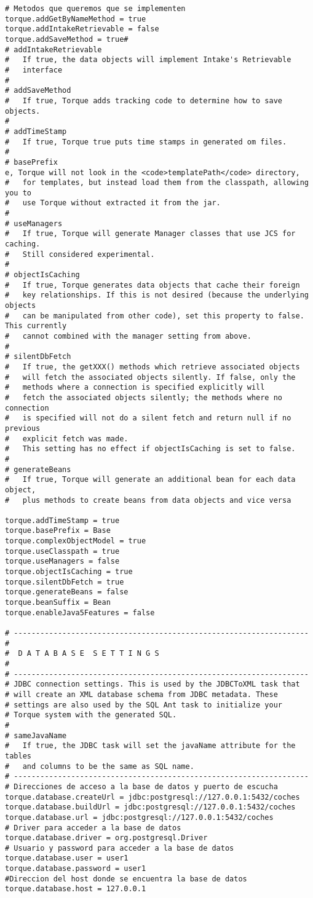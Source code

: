 \begin{lstlisting}
# Metodos que queremos que se implementen
torque.addGetByNameMethod = true
torque.addIntakeRetrievable = false
torque.addSaveMethod = true#
# addIntakeRetrievable
#   If true, the data objects will implement Intake's Retrievable
#   interface
#
# addSaveMethod
#   If true, Torque adds tracking code to determine how to save objects.
#
# addTimeStamp
#   If true, Torque true puts time stamps in generated om files.
#
# basePrefix
e, Torque will not look in the <code>templatePath</code> directory,
#   for templates, but instead load them from the classpath, allowing you to
#   use Torque without extracted it from the jar.
#
# useManagers
#   If true, Torque will generate Manager classes that use JCS for caching.
#   Still considered experimental.
#
# objectIsCaching
#   If true, Torque generates data objects that cache their foreign
#   key relationships. If this is not desired (because the underlying objects
#   can be manipulated from other code), set this property to false. This currently
#   cannot combined with the manager setting from above.
#
# silentDbFetch
#   If true, the getXXX() methods which retrieve associated objects
#   will fetch the associated objects silently. If false, only the
#   methods where a connection is specified explicitly will
#   fetch the associated objects silently; the methods where no connection
#   is specified will not do a silent fetch and return null if no previous
#   explicit fetch was made.
#   This setting has no effect if objectIsCaching is set to false.
#
# generateBeans
#   If true, Torque will generate an additional bean for each data object,
#   plus methods to create beans from data objects and vice versa

torque.addTimeStamp = true
torque.basePrefix = Base
torque.complexObjectModel = true
torque.useClasspath = true
torque.useManagers = false
torque.objectIsCaching = true
torque.silentDbFetch = true
torque.generateBeans = false
torque.beanSuffix = Bean
torque.enableJava5Features = false

# -------------------------------------------------------------------
#
#  D A T A B A S E  S E T T I N G S
#
# -------------------------------------------------------------------
# JDBC connection settings. This is used by the JDBCToXML task that
# will create an XML database schema from JDBC metadata. These
# settings are also used by the SQL Ant task to initialize your
# Torque system with the generated SQL.
#
# sameJavaName
#   If true, the JDBC task will set the javaName attribute for the tables
#   and columns to be the same as SQL name.
# -------------------------------------------------------------------
# Direcciones de acceso a la base de datos y puerto de escucha
torque.database.createUrl = jdbc:postgresql://127.0.0.1:5432/coches
torque.database.buildUrl = jdbc:postgresql://127.0.0.1:5432/coches
torque.database.url = jdbc:postgresql://127.0.0.1:5432/coches
# Driver para acceder a la base de datos
torque.database.driver = org.postgresql.Driver
# Usuario y password para acceder a la base de datos
torque.database.user = user1
torque.database.password = user1
#Direccion del host donde se encuentra la base de datos
torque.database.host = 127.0.0.1


\end{lstlisting}

